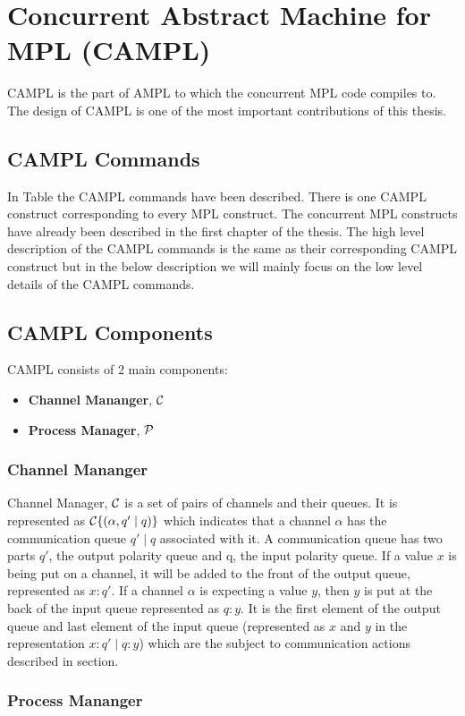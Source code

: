\documentclass[11pt]{article}
\newcommand{\<}{\langle}
\renewcommand{\>}{\rangle}
\begin{document}
\section {Concurrent Abstract Machine for MPL (CAMPL)}
CAMPL is the part of AMPL to which the concurrent MPL code compiles to. The design of CAMPL is one of the most important contributions of this thesis.
\subsection {CAMPL Commands}
In Table the CAMPL commands have been described. There is one CAMPL construct corresponding to every MPL construct. The concurrent MPL constructs have already been described in the first chapter of the thesis. The high level description of the CAMPL commands is the same as their corresponding CAMPL construct but in the below description we will mainly focus on the low level details of the CAMPL commands.
\subsection {CAMPL Components}
CAMPL consists of 2 main components:
\begin{itemize}
    \item {\bf Channel Mananger}, $\cal C$
    \item {\bf Process Manager}, $\cal P$
\end{itemize}
\subsubsection {Channel Mananger}
Channel Manager, $\cal C$ is a set of pairs of channels and their queues. It is represented as  ${\cal C}\{ (\alpha,q' \mid q) \}$ which indicates that a channel $\alpha$ has the communication queue $q' \mid q$ associated with it. A communication queue has two parts $q'$, the output polarity queue and q, the input polarity queue. If a value $x$ is being put on a channel, it will be added to the front of the output queue, represented as $x:q'$. If a channel $\alpha$ is expecting a value $y$, then $y$ is put at the back of the input queue represented as $q:y$. It is the first element of the output queue and last element of the input queue (represented as $x$ and $y$ in the representation $x:q' \mid q:y$) which are the subject to communication actions described in section. 
\subsubsection {Process Mananger}
\end{document}
